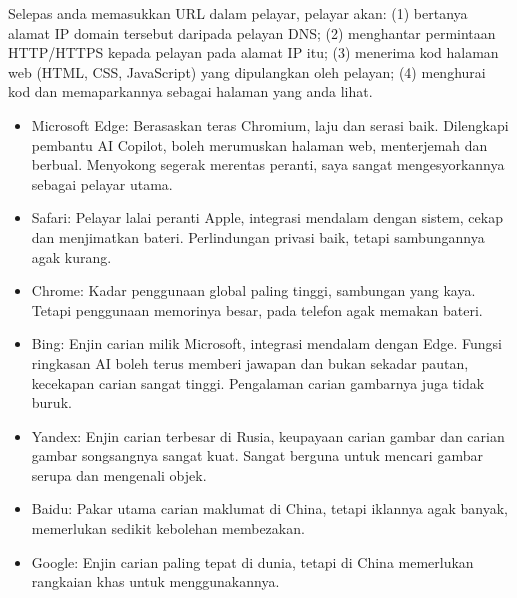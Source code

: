 
Selepas anda memasukkan URL dalam pelayar, pelayar akan: (1) bertanya alamat IP domain tersebut daripada pelayan DNS; (2) menghantar permintaan HTTP/HTTPS kepada pelayan pada alamat IP itu; (3) menerima kod halaman web (HTML, CSS, JavaScript) yang dipulangkan oleh pelayan; (4) menghurai kod dan memaparkannya sebagai halaman yang anda lihat.


\begin{itemize}
  \item Microsoft Edge: Berasaskan teras Chromium, laju dan serasi baik. Dilengkapi pembantu AI Copilot, boleh merumuskan halaman web, menterjemah dan berbual. Menyokong segerak merentas peranti, saya sangat mengesyorkannya sebagai pelayar utama.
  \item Safari: Pelayar lalai peranti Apple, integrasi mendalam dengan sistem, cekap dan menjimatkan bateri. Perlindungan privasi baik, tetapi sambungannya agak kurang.
  \item Chrome: Kadar penggunaan global paling tinggi, sambungan yang kaya. Tetapi penggunaan memorinya besar, pada telefon agak memakan bateri.
\end{itemize}


\begin{itemize}
  \item Bing: Enjin carian milik Microsoft, integrasi mendalam dengan Edge. Fungsi ringkasan AI boleh terus memberi jawapan dan bukan sekadar pautan, kecekapan carian sangat tinggi. Pengalaman carian gambarnya juga tidak buruk.
  \item Yandex: Enjin carian terbesar di Rusia, keupayaan carian gambar dan carian gambar songsangnya sangat kuat. Sangat berguna untuk mencari gambar serupa dan mengenali objek.
  \item Baidu: Pakar utama carian maklumat di China, tetapi iklannya agak banyak, memerlukan sedikit kebolehan membezakan.
  \item Google: Enjin carian paling tepat di dunia, tetapi di China memerlukan rangkaian khas untuk menggunakannya.
\end{itemize}


